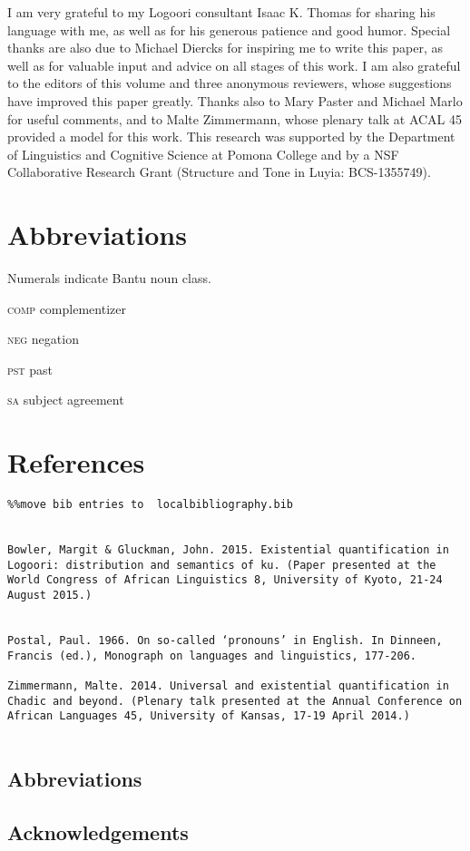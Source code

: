 \documentclass[output=paper]{langsci/langscibook}
\begin{document}
I am very grateful to my Logoori consultant Isaac K. Thomas for sharing his language with me, as well as for his generous patience and good humor. Special thanks are also due to Michael Diercks for inspiring me to write this paper, as well as for valuable input and advice on all stages of this work. I am also grateful to the editors of this volume and three anonymous reviewers, whose suggestions have improved this paper greatly. Thanks also to Mary Paster and Michael Marlo for useful comments, and to Malte Zimmermann, whose plenary talk at ACAL 45 provided a model for this work. This research was supported by the Department of Linguistics and Cognitive Science at Pomona College and by a NSF Collaborative Research Grant (Structure and Tone in Luyia: BCS-1355749).

\chapter{Abbreviations}

Numerals indicate Bantu noun class.

\textsc{comp}  complementizer

\textsc{neg}  negation

\textsc{pst}  past

\textsc{sa}  subject agreement

\chapter{References}



\begin{verbatim}%%move bib entries to  localbibliography.bib


Bowler, Margit & Gluckman, John. 2015. Existential quantification in Logoori: distribution and semantics of ku. (Paper presented at the World Congress of African Linguistics 8, University of Kyoto, 21-24 August 2015.)


Postal, Paul. 1966. On so-called ‘pronouns’ in English. In Dinneen, Francis (ed.), Monograph on languages and linguistics, 177-206.

Zimmermann, Malte. 2014. Universal and existential quantification in Chadic and beyond. (Plenary talk presented at the Annual Conference on African Languages 45, University of Kansas, 17-19 April 2014.)


\end{verbatim}

\section*{Abbreviations}
\section*{Acknowledgements}

\printbibliography[heading=subbibliography,notkeyword=this]
\end{document}
